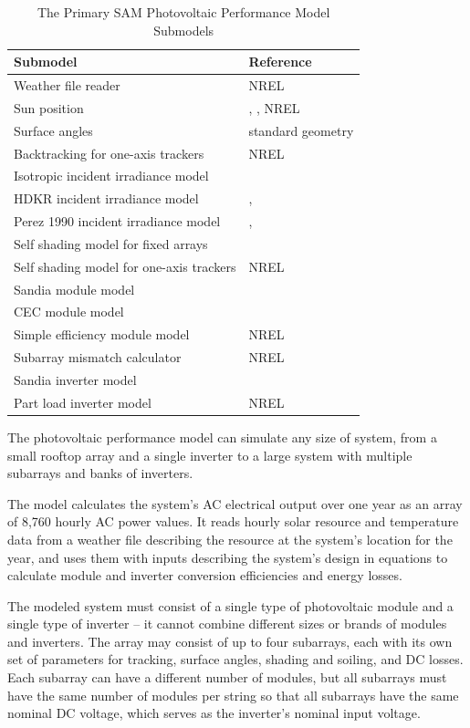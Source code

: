 \documentclass[12pt,letterpaper]{article}
\begin{document}
\begin{table}
\begin{center}
\caption{The Primary SAM Photovoltaic Performance Model Submodels}
\begin{tabular}{ll}
\midrule
Submodel & Reference\\
\midrule
Weather file reader & NREL\\
Sun position & \citet{michalsky1988}, \citet{iqbal1983}, NREL\\
Surface angles & standard geometry\\
Backtracking for one-axis trackers & NREL\\
Isotropic incident irradiance model & \citet{liu1963}\\
HDKR incident irradiance model & \citet{duffie2013}, \citet{reindl1988}\\
Perez 1990 incident irradiance model & \citet{perez1988}, \citet{perez1990}\\
Self shading model for fixed arrays & \citet{deline2013a}\\
Self shading model for one-axis trackers & NREL \\
Sandia module model & \citet{king2004}\\
CEC module model & \citet{desoto2004a}\\
Simple efficiency module model & NREL\\
Subarray mismatch calculator & NREL \\
Sandia inverter model & \citet{king2007}\\
Part load inverter model & NREL\\
\hline
\end{tabular}
\label{tab-submodels}
\end{center}
\end{table}


The photovoltaic performance model can simulate any size of system, from a small rooftop array and a single inverter to a large system with multiple subarrays and banks of inverters.

The model calculates the system's AC electrical output over one year as an array of 8,760 hourly AC power values. It reads hourly solar resource and temperature data from a weather file describing the resource at the system's location for the year, and uses them with inputs describing the system's design in equations to calculate module and inverter conversion efficiencies and energy losses.

The modeled system must consist of a single type of photovoltaic module and a single type of inverter -- it cannot combine different sizes or brands of modules and inverters. The array may consist of up to four subarrays, each with its own set of parameters for tracking, surface angles, shading and soiling, and DC losses. Each subarray can have a different number of modules, but all subarrays must have the same number of modules per string so that all subarrays have the same nominal DC voltage, which serves as the inverter's nominal input voltage.
\end{document}
